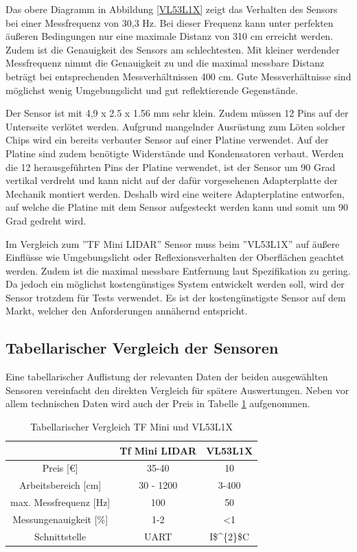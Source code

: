 Das obere Diagramm in Abbildung \ref{VL53L1X} zeigt das Verhalten des Sensors bei einer Messfrequenz von 30,3 Hz. Bei dieser Frequenz kann unter perfekten äußeren Bedingungen nur eine maximale Distanz von 310 cm erreicht werden. Zudem ist die Genauigkeit des Sensors am schlechtesten. Mit kleiner werdender Messfrequenz nimmt die Genauigkeit zu und die maximal messbare Distanz beträgt bei entsprechenden Messverhältnissen 400 cm. Gute Messverhältnisse sind möglichst wenig Umgebungslicht und gut reflektierende Gegenstände. \cite{VL53L1X_manual}


Der Sensor ist mit 4,9 x 2.5 x 1.56 mm sehr klein. Zudem müssen 12 Pins auf der Unterseite verlötet werden. Aufgrund mangelnder Ausrüstung zum Löten solcher Chips wird ein bereits verbauter Sensor auf einer Platine verwendet. Auf der Platine sind zudem benötigte Widerstände und Kondensatoren verbaut. Werden die 12 herausgeführten Pins der Platine verwendet, ist der Sensor um 90 Grad vertikal verdreht und kann nicht auf der dafür vorgesehenen Adapterplatte der Mechanik montiert werden. Deshalb wird eine weitere Adapterplatine entworfen, auf welche die Platine mit dem Sensor aufgesteckt werden kann und somit um 90 Grad gedreht wird.


Im Vergleich zum ''TF Mini LIDAR'' Sensor muss beim ''VL53L1X'' auf äußere Einflüsse wie Umgebungslicht oder Reflexionsverhalten der Oberflächen geachtet werden. Zudem ist die maximal messbare Entfernung laut Spezifikation zu gering. Da jedoch ein möglichst kostengünstiges System entwickelt werden soll, wird der Sensor trotzdem für Tests verwendet. Es ist der kostengünstigste Sensor auf dem Markt, welcher den Anforderungen annähernd entspricht.



\subsection{Tabellarischer Vergleich der Sensoren}

Eine tabellarischer Auflistung der relevanten Daten der beiden ausgewählten Sensoren vereinfacht den direkten Vergleich für spätere Auswertungen. Neben vor allem technischen Daten wird auch der Preis in Tabelle \ref{vergleich} aufgenommen.

\begin{table}[H]
	\centering
	\caption{Tabellarischer Vergleich TF Mini und VL53L1X}
	\begin{tabular}{|c|c|c|}
		\hline
		\textbf{} 				& \textbf{Tf Mini LIDAR}	& \textbf{VL53L1X} 	 \\ \hline
		Preis [€]				&  35-40					& 10			\\ \hline
		Arbeitsbereich [cm]		&  30 - 1200   				& 3-400			\\ \hline
		max. Messfrequenz [Hz]	&  100						& 50 			\\ \hline
		Messungenauigkeit [\%]	&  1-2 						& <1			\\ \hline
		Schnittstelle 			&  \ac{UART}				& \ac{I$^{2}$C}\\ \hline
 		
	\end {tabular}
	\label{vergleich}
\end{table}


